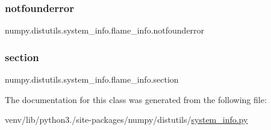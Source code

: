 \subsubsection{\texorpdfstring{notfounderror}{notfounderror}}
{\footnotesize\ttfamily numpy.\+distutils.\+system\+\_\+info.\+flame\+\_\+info.\+notfounderror\hspace{0.3cm}{\ttfamily [static]}}

\mbox{\label{classnumpy_1_1distutils_1_1system__info_1_1flame__info_a5457945c4b97dffad697f3548e6d3017}} 
\subsubsection{\texorpdfstring{section}{section}}
{\footnotesize\ttfamily numpy.\+distutils.\+system\+\_\+info.\+flame\+\_\+info.\+section\hspace{0.3cm}{\ttfamily [static]}}



The documentation for this class was generated from the following file\+:\begin{DoxyCompactItemize}
\item 
venv/lib/python3./site-\/packages/numpy/distutils/\hyperlink{system__info_8py}{system\+\_\+info.\+py}\end{DoxyCompactItemize}
